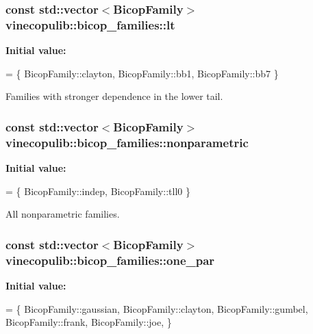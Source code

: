 \subsubsection[{\texorpdfstring{lt}{lt}}]{\setlength{\rightskip}{0pt plus 5cm}const std\+::vector$<${\bf Bicop\+Family}$>$ vinecopulib\+::bicop\+\_\+families\+::lt}\hypertarget{namespacevinecopulib_1_1bicop__families_a5a5f349f07638768ff8b1bb2ae90d102}{}\label{namespacevinecopulib_1_1bicop__families_a5a5f349f07638768ff8b1bb2ae90d102}
{\bfseries Initial value\+:}
\begin{DoxyCode}
= \{
            BicopFamily::clayton, 
            BicopFamily::bb1, 
            BicopFamily::bb7
        \}
\end{DoxyCode}


Families with stronger dependence in the lower tail. 

\subsubsection[{\texorpdfstring{nonparametric}{nonparametric}}]{\setlength{\rightskip}{0pt plus 5cm}const std\+::vector$<${\bf Bicop\+Family}$>$ vinecopulib\+::bicop\+\_\+families\+::nonparametric}\hypertarget{namespacevinecopulib_1_1bicop__families_a01c7c990cc34b1b74d115858a52fcdc5}{}\label{namespacevinecopulib_1_1bicop__families_a01c7c990cc34b1b74d115858a52fcdc5}
{\bfseries Initial value\+:}
\begin{DoxyCode}
= \{
            BicopFamily::indep,
            BicopFamily::tll0
        \}
\end{DoxyCode}


All nonparametric families. 

\subsubsection[{\texorpdfstring{one\+\_\+par}{one_par}}]{\setlength{\rightskip}{0pt plus 5cm}const std\+::vector$<${\bf Bicop\+Family}$>$ vinecopulib\+::bicop\+\_\+families\+::one\+\_\+par}\hypertarget{namespacevinecopulib_1_1bicop__families_aba503484b0a13cfb0e67c026e2f295d4}{}\label{namespacevinecopulib_1_1bicop__families_aba503484b0a13cfb0e67c026e2f295d4}
{\bfseries Initial value\+:}
\begin{DoxyCode}
= \{
            BicopFamily::gaussian,
            BicopFamily::clayton,
            BicopFamily::gumbel,
            BicopFamily::frank,
            BicopFamily::joe,
        \}
\end{DoxyCode}


